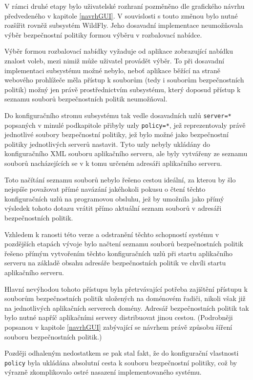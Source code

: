 V rámci druhé etapy bylo uživatelské rozhraní pozměněno dle grafického návrhu předvedeného v kapitole \ref{navrhGUI}. V souvislosti s touto změnou bylo nutné rozšířit rovněž subsystém WildFly. Jeho dosavadní implementace neumožňovala výběr bezpečnostní politiky formou výběru v rozbalovací nabídce.

Výběr formou rozbalovací nabídky vyžaduje od aplikace zobrazující nabídku znalost voleb, mezi nimiž může uživatel provádět výběr. To při dosavadní implementaci subsystému možné nebylo, neboť aplikace běžící na straně webového prohlížeče měla přístup k souborům (tedy i souborům bezpečnostních politik) možný jen právě prostřednictvím subsystému, který doposud přístup k seznamu souborů bezpečnostních politik neumožňoval.

Do konfiguračního stromu subsystému tak vedle dosavadních uzlů {\tt server=*} popsaných v minulé podkapitole přibyly uzly {\tt policy=*}, jež reprezentovaly právě jednotlivé soubory bezpečnostní politiky, jež bylo možné jako bezpečnostní politiky jednotlivých serverů nastavit. Tyto uzly nebyly ukládány do konfiguračního XML souboru aplikačního serveru, ale byly vytvářeny ze seznamu souborů nacházejících se v k tomu určeném adresáři aplikačního serveru.

Toto načítání seznamu souborů nebylo řešeno cestou ideální, za kterou by šlo nejspíše považovat přímé navázání jakéhokoli pokusu o čtení těchto konfiguračních uzlů na programovou obsluhu, jež by umožnila jako přímý výsledek tohoto dotazu vrátit přímo aktuální seznam souborů v adresáři bezpečnostních politik.

Vzhledem k ranosti této verze a odstranění těchto schopností systému v pozdějších etapách vývoje bylo načtení seznamu souborů bezpečnostních politik řešeno přímým vytvořením těchto konfiguračních uzlů při startu aplikačního serveru na základě obsahu adresáře bezpečnostních politik ve chvíli startu aplikačního serveru.

Hlavní nevýhodou tohoto přístupu byla přetrvávající potřeba zajištění přístupu k souborům bezpečnostních politik uložených na doménovém řadiči, nikoli však již na jednotlivých aplikačních serverech domény. Adresář bezpečnostních politik tak bylo nutné napříč aplikačními servery distribuovat jinou cestou. (Podrobněji popsanou v kapitole \ref{navrhGUI} zabývající se návrhem právě způsobu šíření souboru bezpečnostních politik.)

Později odhaleným nedostatkem se pak stal fakt, že do konfigurační vlastnosti {\tt policy} byla ukládána absolutní cesta k souboru bezpečnostní politiky, což by výrazně zkomplikovalo ostré nasazení implementovaného systému.

